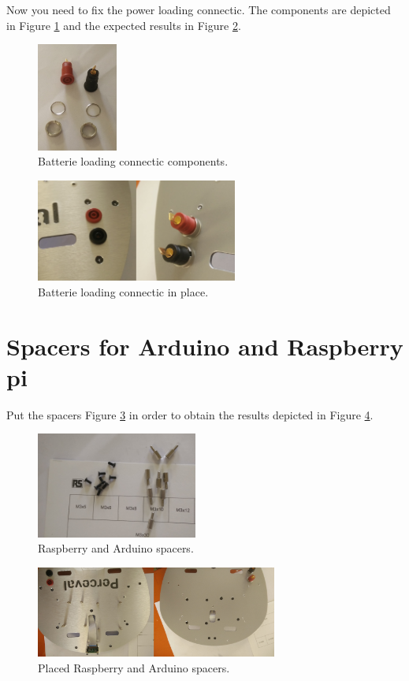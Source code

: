 \documentclass[10pt,a4paper]{report}   %
\begin{document}
Now you need to fix the power loading connectic. The components are depicted in Figure \ref{fig:53} and the expected results in Figure \ref{fig:54}.

\begin{figure}[H]
\center
\includegraphics[width=100px]{images/53.jpg}
\caption{Batterie loading connectic components.}
\label{fig:53}
\end{figure}

\begin{figure}[H]
\center
\includegraphics[width=250px]{images/54.jpg}
\caption{Batterie loading connectic in place.}
\label{fig:54}
\end{figure}

\section{Spacers for Arduino and Raspberry pi}

Put the spacers Figure \ref{fig:55} in order to obtain the results depicted in Figure \ref{fig:56}.

\begin{figure}[H]
\center
\includegraphics[width=200px]{images/55.jpg}
\caption{Raspberry and Arduino spacers.}
\label{fig:55}
\end{figure}

\begin{figure}[H]
\center
\includegraphics[width=300px]{images/56.jpg}
\caption{Placed Raspberry and Arduino spacers.}
\label{fig:56}
\end{figure}
\end{document}
